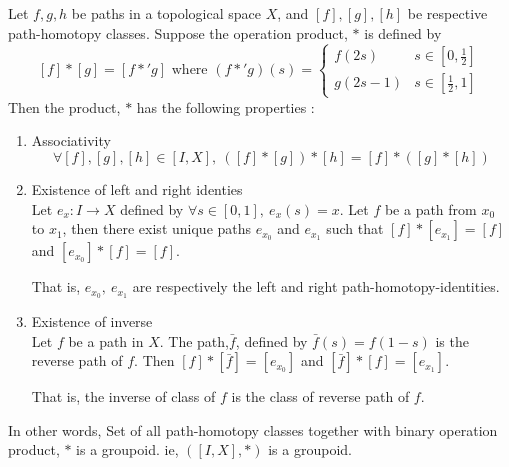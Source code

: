 \begin{theorem}
	Let $f,g,h$ be paths in a topological space $X$, and $[f],[g],[h]$ be respective path-homotopy classes.
	Suppose the operation product, $\ast$ is defined by
	\[ [f]\ast{}[g] = [f \ast{'} g] \text{ where } (f \ast{'} g)(s) = \begin{cases} f(2s) & s \in [0,\frac{1}{2}] \\ g(2s-1) & s \in [\frac{1}{2},1] \end{cases} \]
	Then the product, $\ast{}$ has the following properties : 
	\begin{enumerate}
		\item Associativity
			\[ \forall [f],[g],[h] \in [I,X],\ \left([f]\ast{}[g]\right)\ast{}[h] = [f] \ast{}\left([g]\ast{}[h]\right) \]
		\item Existence of left and right identies\\
			Let $e_x : I \to X$ defined by $\forall s \in [0,1],\ e_x(s) = x$.
			Let $f$ be a path from $x_0$ to $x_1$, then there exist unique paths $e_{x_0}$ and $e_{x_1}$ such that $[f]\ast{}[e_{x_1}] = [f]$ and $[e_{x_0}]\ast{}[f] = [f]$.
		\begin{commentary}
			That is, $e_{x_0},\ e_{x_1}$ are respectively the left and right path-homotopy-identities.
		\end{commentary}
		\item Existence of inverse\\
			Let $f$ be a path in $X$.
			The path,$\bar{f}$, defined by $\bar{f}(s) = f(1-s)$ is the reverse path of $f$.
			Then $[f]\ast{}[\bar{f}] = [e_{x_0}]$ and $[\bar{f}]\ast{}[f] = [e_{x_1}]$.
		\begin{commentary}
			That is, the inverse of class of $f$ is the class of reverse path of $f$.
		\end{commentary}
	\end{enumerate}
\begin{commentary}
	In other words, Set of all path-homotopy classes together with binary operation product, $\ast$ is a groupoid.
	ie, $([I,X],\ast{})$ is a groupoid.
\end{commentary}
\end{theorem}
